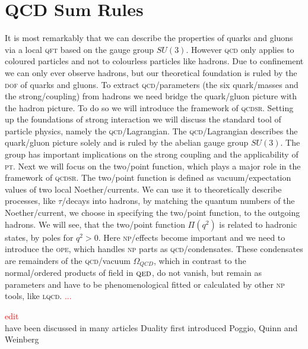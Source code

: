 \documentclass[../../index.tex]{subfiles}
\begin{document}
\chapter{QCD Sum Rules}
\label{ch:theoreticalBackground}
It is most remarkably that we can describe the properties of quarks and gluons
via a local \textsc{qft} based on the gauge group $SU(3)$. However \textsc{qcd}
only applies to coloured particles and not to colourless particles like hadrons.
Due to confinement we can only ever observe hadrons, but our theoretical
foundation is ruled by the \textsc{dof} of quarks and gluons. To extract
\textsc{qcd}\-/parameters (the six quark\-/masses and the strong\-/coupling)
from hadrons we need bridge the quark\-/gluon picture with the hadron picture.
To do so we will introduce the framework of \textsc{qcdsr}. Setting up the
foundations of strong interaction we will discuss the standard tool of particle
physics, namely the \textsc{qcd}\-/Lagrangian. The \textsc{qcd}\-/Lagrangian
describes the quark\-/gluon picture solely and is ruled by the abelian gauge
group $SU(3)$. The group has important implications on the strong coupling and the
applicability of \textsc{pt}. Next we will focus on the two\-/point function,
which plays a major role in the framework of \textsc{qcdsr}. The two\-/point
function is defined as vacuum\-/expectation values of two local Noether\-/currents. We can use
it to theoretically describe processes, like $\tau$\-/decays into hadrons,
by matching the quantum numbers of the Noether\-/current, we choose in
specifying the two\-/point function, to the outgoing hadrons. We will see, that
the two\-/point function $\Pi(q^2)$ is related to hadronic states, by poles for
$q^2 > 0$. Here \textsc{np}\-/effects become important and we need to introduce
the \textsc{ope}, which handles \textsc{np} parts as
\textsc{qcd}\-/condensates. These condensates are remainders of the
\textsc{qcd}\-/vacuum $\Omega_{QCD}$, which in contrast to the normal\-/ordered
products of field in $\textsc{qed}$, do not vanish, but remain as parameters and have to
be phenomenological fitted or calculated by other \textsc{np} tools, like
\textsc{lqcd}. \textcolor{red}{...}

\textcolor{red}{edit} \\
have been discussed in many articles
\cite{Narison1989,Rafael1997,Colangelo2000,Dominguez2013} Duality first
introduced Poggio, Quinn and Weinberg \cite{Poggio1975}
\end{document}
